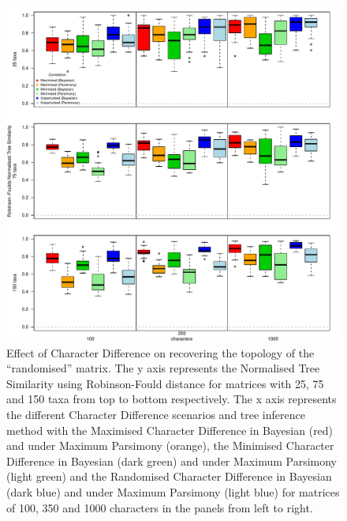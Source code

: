 \documentclass[12pt,letterpaper]{article}
\begin{document}
\begin{figure}[!htbp]
\centering
   \includegraphics[width=1\textwidth]{../Figures/RF_results_null.pdf} 
\caption{\small{Effect of Character Difference on recovering the topology of the ``randomised'' matrix. The y axis represents the Normalised Tree Similarity using Robinson-Fould distance for matrices with 25, 75 and 150 taxa from top to bottom respectively. The x axis represents the different Character Difference scenarios and tree inference method with the Maximised Character Difference in Bayesian (red) and under Maximum Parsimony (orange), the Minimised Character Difference in Bayesian (dark green) and under Maximum Parsimony (light green) and the Randomised Character Difference in Bayesian (dark blue) and under Maximum Parsimony (light blue) for matrices of 100, 350 and 1000 characters in the panels from left to right.}}
\label{Fig:RF_results_rand}
\end{figure}
\end{document}
